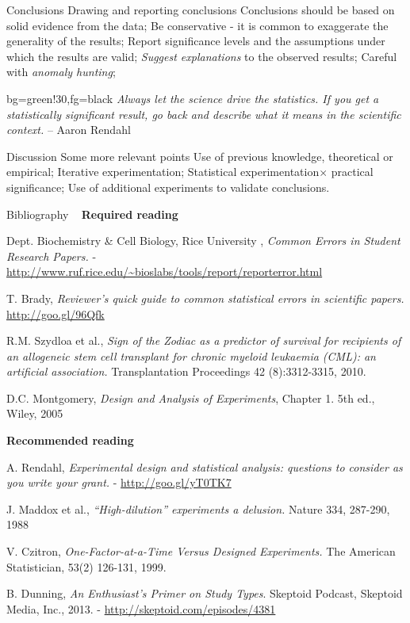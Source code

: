 \documentclass[t]{beamer}
\begin{document}
\begin{ftst}
{Conclusions}
{Drawing and reporting conclusions}
\bitems Conclusions should be based on solid evidence from the data;
	\spitem Be conservative - it is common to exaggerate the generality of the results;
	\spitem Report significance levels and the assumptions under which the results are valid;
	\spitem \textit{Suggest explanations} to the observed results;
	\spitem Careful with \textit{anomaly hunting};
\eitem

\begin{colorblock}{}{bg=green!30,fg=black}
	\small\textit{Always let the science drive the statistics. If you get a statistically significant result, go back and describe what it means in the scientific context.}
	\flushright\small -- Aaron Rendahl
\end{colorblock}
\end{ftst}

\begin{ftst}
{Discussion}
 {Some more relevant points}
\bitems Use of previous knowledge, theoretical or empirical;
	\spitem Iterative experimentation;
	\spitem Statistical experimentation$\times$ practical significance;
	\spitem Use of additional experiments to validate conclusions.
\eitem
\end{ftst}



\begin{ftst}
{Bibliography}
{\ }
\scriptsize
\textbf{Required reading}

\benums Dept. Biochemistry \& Cell Biology, Rice University , \textit{Common Errors in Student Research Papers.} - {\tiny\url{http://www.ruf.rice.edu/~bioslabs/tools/report/reporterror.html}}
\item T. Brady, \textit{Reviewer's quick guide to common statistical errors in scientific papers.}\\
{\tiny\url{http://goo.gl/96Qfk}}
\item R.M. Szydloa et al., \textit{Sign of the Zodiac as a predictor of survival for recipients of an allogeneic stem cell transplant for chronic myeloid leukaemia (CML): an artificial association.} Transplantation Proceedings 42 (8):3312-3315, 2010.
\item D.C. Montgomery, \textit{Design and Analysis of Experiments}, Chapter 1. 5th ed., Wiley, 2005
\eenum

\textbf{Recommended reading}

\benums A. Rendahl, \textit{Experimental design and statistical analysis: questions to consider as you write your grant.} - {\tiny\url{http://goo.gl/yT0TK7}}
\item J. Maddox et al., \textit{``High-dilution'' experiments a delusion.} Nature 334, 287-290, 1988
\item V. Czitron, \textit{One-Factor-at-a-Time Versus Designed Experiments.} The American Statistician, 53(2) 126-131, 1999.
\item B. Dunning, \textit{An Enthusiast's Primer on Study Types}. Skeptoid Podcast, Skeptoid Media, Inc., 2013. - 
{\tiny\url{http://skeptoid.com/episodes/4381}}

\eenum
\end{ftst}
\end{document}
